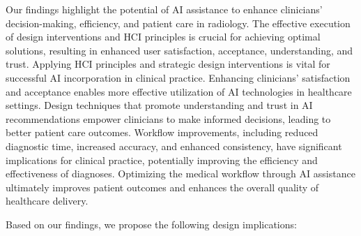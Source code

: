 Our findings highlight the potential of \ac{AI} assistance to enhance clinicians' decision-making, efficiency, and patient care in radiology.
The effective execution of design interventions and \ac{HCI} principles is crucial for achieving optimal solutions, resulting in enhanced user satisfaction, acceptance, understanding, and trust.
Applying \ac{HCI} principles and strategic design interventions is vital for successful \ac{AI} incorporation in clinical practice.
Enhancing clinicians' satisfaction and acceptance enables more effective utilization of \ac{AI} technologies in healthcare settings.
Design techniques that promote understanding and trust in \ac{AI} recommendations empower clinicians to make informed decisions, leading to better patient care outcomes.
Workflow improvements, including reduced diagnostic time, increased accuracy, and enhanced consistency, have significant implications for clinical practice, potentially improving the efficiency and effectiveness of diagnoses.
Optimizing the medical workflow through \ac{AI} assistance ultimately improves patient outcomes and enhances the overall quality of healthcare delivery.

\noindent
Based on our findings, we propose the following design implications:

\vspace{0.05mm}

